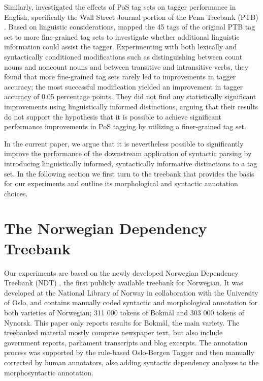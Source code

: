 \documentclass[11pt,a4paper]{article}
\begin{document}
Similarly,  investigated the effects of PoS tag sets on tagger
performance in English, specifically the Wall Street Journal portion of the
Penn Treebank (PTB) \cite{Mar:San:Mar:93}. Based on linguistic considerations,
 mapped the 45 tags of the original PTB tag set to more
fine-grained tag sets to investigate whether additional linguistic information
could assist the tagger. Experimenting with both lexically and syntactically
conditioned modifications such as distinguishing between count nouns and
noncount nouns and between transitive and intransitive verbs, they found that
more fine-grained tag sets rarely led to improvements in tagger accuracy; the
most successful modification yielded an improvement in tagger accuracy of 0.05
percentage points. They did not find any statistically significant
improvements using linguistically informed distinctions, arguing that their
results do not support the hypothesis that it is possible to achieve
significant performance improvements in PoS tagging by utilizing a
finer-grained tag set.

In the current paper, we argue that it is nevertheless possible to significantly improve the performance
of the downstream application of syntactic parsing by introducing
linguistically informed, syntactically informative distinctions to a tag set.
In the following section we first turn to the treebank that provides the basis for our experiments and
outline its morphological and syntactic annotation choices.

\section{The Norwegian Dependency Treebank}
\label{sec:data}
Our experiments are based on the newly developed Norwegian Dependency Treebank
(NDT) \cite{Sol:Skj:Ovr:14}, the first publicly available treebank for
Norwegian. It was developed at the National Library of Norway in collaboration
with the University of Oslo, and contains manually coded syntactic and
morphological annotation for both varieties of Norwegian; 311 000 tokens of
Bokmål and 303 000 tokens of Nynorsk. This paper only reports results for
Bokmål, the main variety. The treebanked material mostly comprise newspaper
text, but also include government reports, parliament transcripts and blog
excerpts. The annotation process was supported by the rule-based Oslo-Bergen
Tagger \cite{Hag:Joh:Nok:00} and then manually corrected by human annotators, also adding
syntactic dependency analyses to the morphosyntactic annotation.
\end{document}

